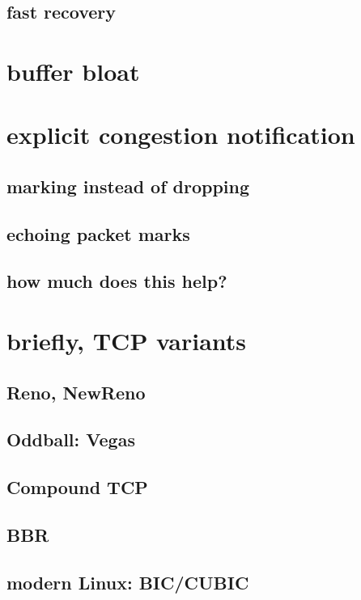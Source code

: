 \subsection{fast recovery}

\section{buffer bloat}

\section{explicit congestion notification}

\subsection{marking instead of dropping}

\subsection{echoing packet marks}

\subsection{how much does this help?}

\section{briefly, TCP variants}

\subsection{Reno, NewReno}

\subsection{Oddball: Vegas}

\subsection{Compound TCP}

\subsection{BBR}

\subsection{modern Linux: BIC/CUBIC}
